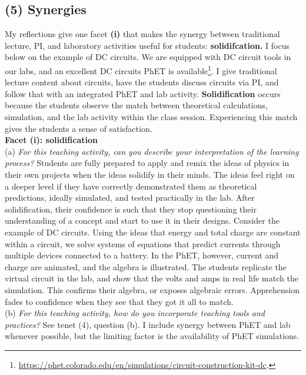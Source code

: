 \documentclass[../../../main.tex]{subfiles}
\begin{document}
\subsection{(5) Synergies}

My reflections give one facet \textbf{(i)} that makes the synergy between traditional lecture, PI, and laboratory activities useful for students: \textbf{solidifcation.}  I focus below on the example of DC circuits.  We are equipped with DC circuit tools in our labs, and an excellent DC circuits PhET is available\footnote{\url{https://phet.colorado.edu/en/simulations/circuit-construction-kit-dc}.}.  I give traditional lecture content about circuits, have the students discuss circuits via PI, and follow that with an integrated PhET and lab activity.  \textbf{Solidification} occurs because the students observe the match between theoretical calculations, simulation, and the lab activity within the class session.  Experiencing this match gives the students a sense of satisfaction.
\\
\vspace{0.15cm}
\textbf{Facet (i): solidification}
\\
\vspace{0.15cm}
(a) \textit{For this teaching activity, can you describe your interpretation of the learning process?}  Students are fully prepared to apply and remix the ideas of physics in their own projects when the ideas solidify in their minds.  The ideas feel right on a deeper level if they have correctly demonstrated them as theoretical predictions, ideally simulated, and tested practically in the lab.  After solidification, their confidence is such that they stop questioning their understanding of a concept and start to use it in their designs.  Consider the example of DC circuits.  Using the ideas that energy and total charge are constant within a circuit, we solve systems of equations that predict currents through multiple devices connected to a battery.  In the PhET, however, current and charge are animated, and the algebra is illustrated.  The students replicate the virtual circuit in the lab, and show that the volts and amps in real life match the simulation.  This confirms their algebra, or exposes algebraic errors.  Apprehension fades to confidence when they see that they got it all to match.
\\
\vspace{0.15cm}
(b) \textit{For this teaching activity, how do you incorporate teaching tools and practices?}  See tenet (4), question (b).  I include synergy between PhET and lab whenever possible, but the limiting factor is the availability of PhET simulations.
\end{document}
